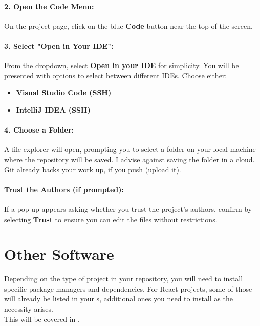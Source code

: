 \paragraph{2. Open the Code Menu:}
On the project page, click on the blue \textbf{Code} button near the top of the screen.
\paragraph{3. Select "Open in Your IDE":}
From the dropdown, select \textbf{Open in your IDE} for simplicity.
You will be presented with options to select between different IDEs. Choose either:
\begin{itemize}
    \item \textbf{Visual Studio Code (SSH)}
    \item \textbf{IntelliJ IDEA (SSH)}
\end{itemize}
\paragraph{4. Choose a Folder:}
A file explorer will open, prompting you to select a folder on your local machine where the repository will be saved.
I advise against saving the folder in a cloud.
Git already backs your work up, if you push (upload it).
\paragraph{Trust the Authors (if prompted):}
If a pop-up appears asking whether you trust the project’s authors, confirm by selecting \textbf{Trust} to ensure you can edit the files without restrictions.

\section{Other Software} \label{sec:other-software}
Depending on the type of project in your repository, you will need to install specific package managers and dependencies.
For React projects, some of those will already be listed in your s, additional ones you
need to install as the necessity arises. \\
This will be covered in .


